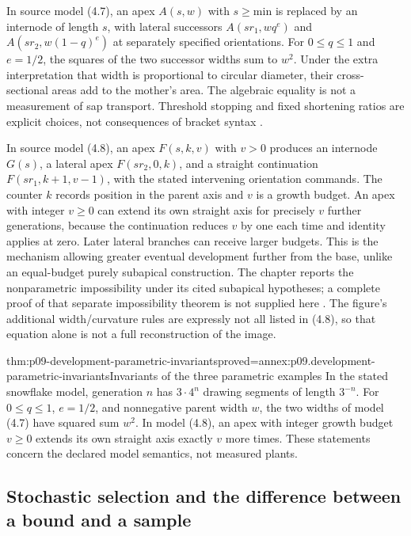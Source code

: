 In source model (4.7), an apex \(A(s,w)\) with \(s\geq\mathrm{min}\)
is replaced by an internode of length \(s\), with lateral successors
\(A(sr_1,wq^e)\) and \(A(sr_2,w(1-q)^e)\) at separately specified
orientations. For \(0\leq q\leq1\) and \(e=1/2\), the squares of
the two successor widths sum to \(w^2\). Under the extra interpretation
that width is proportional to circular diameter, their cross-sectional
areas add to the mother's area. The algebraic equality is not a measurement
of sap transport. Threshold stopping and fixed shortening ratios are
explicit choices, not consequences of bracket syntax
\cite[pp.~551--552]{PrusinkiewiczEtAl1997DevelopmentIntake}.

In source model (4.8), an apex \(F(s,k,v)\) with \(v>0\) produces an
internode \(G(s)\), a lateral apex \(F(sr_2,0,k)\), and a straight
continuation \(F(sr_1,k+1,v-1)\), with the stated intervening orientation
commands. The counter \(k\) records position in the parent axis and \(v\)
is a growth budget. An apex with integer \(v\geq0\) can extend its own
straight axis for precisely \(v\) further generations, because the
continuation reduces \(v\) by one each time and identity applies at zero.
Later lateral branches can receive larger budgets. This is the mechanism
allowing greater eventual development further from the base, unlike
an equal-budget purely subapical construction. The chapter reports the
nonparametric impossibility under its cited subapical hypotheses; a complete
proof of that separate impossibility theorem is not supplied here
\cite[pp.~552--554]{PrusinkiewiczEtAl1997DevelopmentIntake}.
The figure's additional width/curvature rules are expressly not all listed
in (4.8), so that equation alone is not a full reconstruction of the image.

\begin{hbtheorem}{thm:p09-development-parametric-invariants}{proved=annex:p09.development-parametric-invariants}{Invariants of the three parametric examples}
In the stated snowflake model, generation \(n\) has
\(3\cdot4^n\) drawing segments of length \(3^{-n}\).
For \(0\leq q\leq1\), \(e=1/2\), and nonnegative parent width \(w\),
the two widths of model (4.7) have squared sum \(w^2\).
In model (4.8), an apex with integer growth budget \(v\geq0\)
extends its own straight axis exactly \(v\) more times.
These statements concern the declared model semantics, not measured plants.
\end{hbtheorem}

\subsection{Stochastic selection and the difference between a bound and a sample}
\label{sec:p09-development-stochastic}


